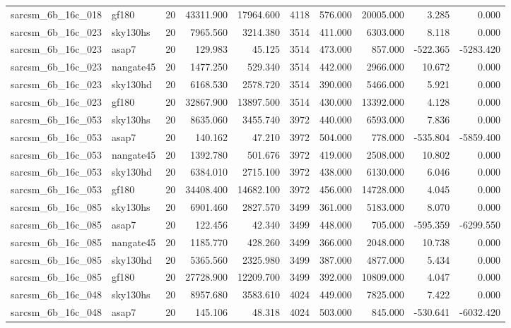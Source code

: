 \begin{tabular}{llrrrrrrrr}
sarcsm\_6b\_16c\_018 & gf180 & 20 & 43311.900 & 17964.600 & 4118 & 576.000 & 20005.000 & 3.285 & 0.000 \\
sarcsm\_6b\_16c\_023 & sky130hs & 20 & 7965.560 & 3214.380 & 3514 & 411.000 & 6303.000 & 8.118 & 0.000 \\
sarcsm\_6b\_16c\_023 & asap7 & 20 & 129.983 & 45.125 & 3514 & 473.000 & 857.000 & -522.365 & -5283.420 \\
sarcsm\_6b\_16c\_023 & nangate45 & 20 & 1477.250 & 529.340 & 3514 & 442.000 & 2966.000 & 10.672 & 0.000 \\
sarcsm\_6b\_16c\_023 & sky130hd & 20 & 6168.530 & 2578.720 & 3514 & 390.000 & 5466.000 & 5.921 & 0.000 \\
sarcsm\_6b\_16c\_023 & gf180 & 20 & 32867.900 & 13897.500 & 3514 & 430.000 & 13392.000 & 4.128 & 0.000 \\
sarcsm\_6b\_16c\_053 & sky130hs & 20 & 8635.060 & 3455.740 & 3972 & 440.000 & 6593.000 & 7.836 & 0.000 \\
sarcsm\_6b\_16c\_053 & asap7 & 20 & 140.162 & 47.210 & 3972 & 504.000 & 778.000 & -535.804 & -5859.400 \\
sarcsm\_6b\_16c\_053 & nangate45 & 20 & 1392.780 & 501.676 & 3972 & 419.000 & 2508.000 & 10.802 & 0.000 \\
sarcsm\_6b\_16c\_053 & sky130hd & 20 & 6384.010 & 2715.100 & 3972 & 438.000 & 6130.000 & 6.046 & 0.000 \\
sarcsm\_6b\_16c\_053 & gf180 & 20 & 34408.400 & 14682.100 & 3972 & 456.000 & 14728.000 & 4.045 & 0.000 \\
sarcsm\_6b\_16c\_085 & sky130hs & 20 & 6901.460 & 2827.570 & 3499 & 361.000 & 5183.000 & 8.070 & 0.000 \\
sarcsm\_6b\_16c\_085 & asap7 & 20 & 122.456 & 42.340 & 3499 & 448.000 & 705.000 & -595.359 & -6299.550 \\
sarcsm\_6b\_16c\_085 & nangate45 & 20 & 1185.770 & 428.260 & 3499 & 366.000 & 2048.000 & 10.738 & 0.000 \\
sarcsm\_6b\_16c\_085 & sky130hd & 20 & 5365.560 & 2325.980 & 3499 & 387.000 & 4877.000 & 5.434 & 0.000 \\
sarcsm\_6b\_16c\_085 & gf180 & 20 & 27728.900 & 12209.700 & 3499 & 392.000 & 10809.000 & 4.047 & 0.000 \\
sarcsm\_6b\_16c\_048 & sky130hs & 20 & 8957.680 & 3583.610 & 4024 & 449.000 & 7825.000 & 7.422 & 0.000 \\
sarcsm\_6b\_16c\_048 & asap7 & 20 & 145.106 & 48.318 & 4024 & 503.000 & 845.000 & -530.641 & -6032.420 \\

\end{tabular}
